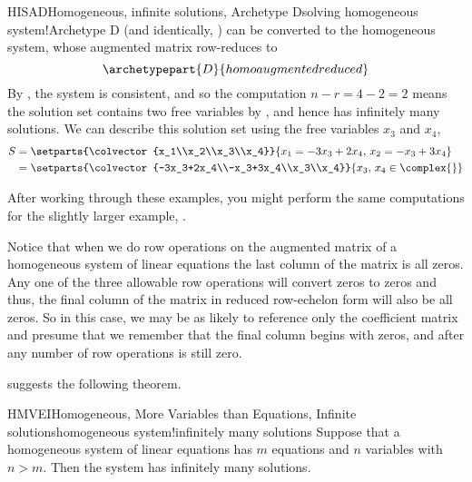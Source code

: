 %
\begin{example}{HISAD}{Homogeneous, infinite solutions, Archetype D}{solving homogeneous system!Archetype D}
 (and identically, ) can be converted to the homogeneous system,
%
%
whose augmented matrix row-reduces to
%
\begin{equation*}
\archetypepart{D}{homoaugmentedreduced}
\end{equation*}
%
By , the system is consistent, and so the computation $n-r=4-2=2$ means the solution set contains two free variables by , and hence has infinitely many solutions.  We can describe this solution set using the free variables $x_3$ and $x_4$,
\begin{align*}
S&=\setparts{\colvector{x_1\\x_2\\x_3\\x_4}}{x_1=-3x_3+2x_4,\,x_2=-x_3+3x_4}\\
 &=\setparts{\colvector{-3x_3+2x_4\\-x_3+3x_4\\x_3\\x_4}}{ x_3,\,x_4\in\complex{\null}}\\
\end{align*}
%
\end{example}
%
After working through these examples, you might perform the same computations for the slightly larger example, .\par
%
Notice that when we do row operations on the augmented matrix of a homogeneous system of linear equations the last column of the matrix is all zeros.  Any one of the three allowable row operations will convert zeros to zeros and thus, the final column of the matrix in reduced row-echelon form will also be all zeros.  So in this case, we may be as likely to reference only the coefficient matrix and presume that we remember that the final column begins with zeros, and after any number of row operations is still zero.\par
%
 suggests the following theorem.
%
\begin{theorem}{HMVEI}{Homogeneous, More Variables than Equations, Infinite solutions}{homogeneous system!infinitely many solutions}
Suppose that a homogeneous system of linear equations has $m$ equations and $n$ variables with $n>m$.  Then the system has infinitely many solutions.
\end{theorem}
